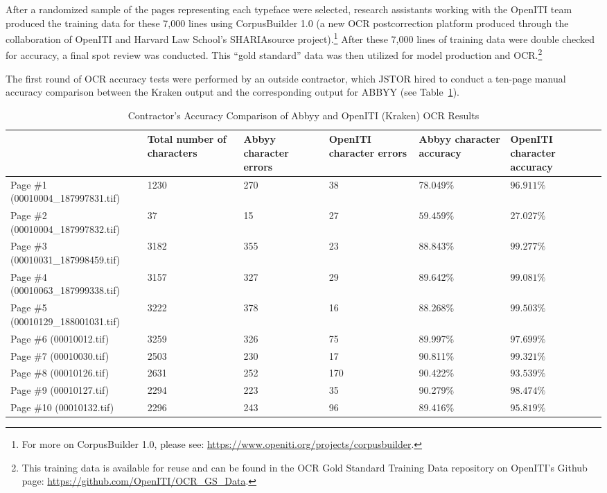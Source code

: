 After a randomized sample of the pages representing each typeface were
selected, research assistants working with the OpenITI team produced the
training data for these 7,000 lines using CorpusBuilder 1.0 (a new OCR
postcorrection platform produced through the collaboration of OpenITI and
Harvard Law School’s SHARIAsource project).\footnote{For more on CorpusBuilder
1.0, please see: \url{https://www.openiti.org/projects/corpusbuilder}.} After
these 7,000 lines of training data were double checked for accuracy, a final
spot review was conducted. This “gold standard” data was then utilized for
model production and OCR.\footnote{This training data is available for reuse
and can be found in the OCR Gold Standard Training Data repository on OpenITI’s
Github page: \url{https://github.com/OpenITI/OCR_GS_Data}.}

The first round of OCR accuracy tests were performed by an outside contractor,
which JSTOR hired to conduct a ten-page manual accuracy comparison between the
Kraken output and the corresponding output for ABBYY (see Table~\ref{tab_champs:table_1}).

\begin{table}[h!]
\begin{center}
\caption{Contractor's Accuracy Comparison of Abbyy and OpenITI (Kraken) OCR Results}
\label{tab_champs:table_1}
	\begin{tabularx}{\textwidth}{p{2.7cm}p{1.7cm}p{1.7cm}p{1.7cm}p{1.7cm}p{1.7cm}} \toprule
& \textbf{Total number of characters} & \textbf{Abbyy character errors} & \textbf{OpenITI character errors} & \textbf{Abbyy character accuracy} & \textbf{OpenITI character accuracy}\\\midrule
Page \#1 \scriptsize{(00010004\_187997831.tif)} & 1230 & 270 & 38 & 78.049\% & $\mathbf{96.911\%}$ \\
Page \#2 \scriptsize{(00010004\_187997832.tif)} & 37& 15 & 27 & $\mathbf{59.459\%}$ & 27.027\%\\
Page \#3 \scriptsize{(00010031\_187998459.tif)} & 3182 & 355 & 23 & 88.843\% & $\mathbf{99.277\%}$\\
Page \#4 \scriptsize{(00010063\_187999338.tif)} & 3157 & 327 & 29 & 89.642\% & $\mathbf{99.081\%}$\\
Page \#5 \scriptsize{(00010129\_188001031.tif)} & 3222 & 378 & 16 & 88.268\% & $\mathbf{99.503\%}$\\
Page \#6 \scriptsize{(00010012.tif)} & 3259 & 326 & 75 & 89.997\% & $\mathbf{97.699\%}$\\
Page \#7 \scriptsize{(00010030.tif)} & 2503 & 230 & 17 & 90.811\% & $\mathbf{99.321\%}$\\
Page \#8 \scriptsize{(00010126.tif)} & 2631 & 252 & 170 & 90.422\% & $\mathbf{93.539\%}$\\
Page \#9 \scriptsize{(00010127.tif)} & 2294 & 223 & 35 & 90.279\% & $\mathbf{98.474\%}$\\
Page \#10 \scriptsize{(00010132.tif)} & 2296 & 243 & 96 & 89.416\% & $\mathbf{95.819\%}$\\
\bottomrule
\end{tabularx}
\end{center}
\end{table}

